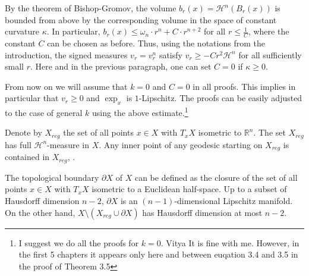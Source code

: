 \documentclass[12pt,leqno]{amsart}
\numberwithin{equation}{section}
\theoremstyle{definition}
\theoremstyle{remark}
\newcommand{\R}{\mathbb{R}}
\begin{document}
By the theorem of Bishop-Gromov, the volume $b_r (x)=\mathcal H^n (B_r(x))$ is bounded from above by the corresponding volume in the
space of constant curvature $\kappa$. In particular, $b_r (x) \leq \omega _n \cdot r^n + C \cdot r^{n+2}$ for all $r\leq \frac 1 C$, where
the constant $C$ can be chosen as before.  Thus, using the notations from the introduction, the signed measures $v_r  =v_r^n $ satisfy
$v_r \geq -Cr^2 \mathcal H^n$  for all sufficiently small $r$.
 Here and in the previous paragraph,  one can set $C=0$ if $\kappa \geq 0$.

 {\color{red} From now on we will assume that $k=0$ and $C=0$ in all proofs. This implies in particular that $v_r\ge 0$ and $\exp_x$ is $1$-Lipschitz. The proofs can be  easily adjusted to the case of general $k$ using the above estimate.}\footnote{{\color{red}I suggest we do all the proofs for $k=0$. Vitya}  It is fine with me. However, in the first 5 chapters it appears only here and  between euqation 3.4 and 3.5 in the proof of Theorem 3.5}


Denote by $X_{reg}$ the set of all points $x\in X$ with $T_xX$   isometric to $\R^n$.  The set $X_{reg}$ has full $\mathcal H^n$-measure in $X$.
Any inner point of any geodesic starting on $X_{reg}$ is contained in $X_{reg}$, \cite{Petparallel}.


The topological boundary $\partial X$ of $X$ can be defined as the closure of the  set of all points $x\in X$ with $T_xX$ isometric to a Euclidean half-space. Up to a subset of Hausdorff dimension $n-2$, $\partial X$ is an $(n-1)$-dimensional Lipschitz manifold. On the other hand, $X\setminus (X_{reg} \cup \partial X)$ has Hausdorff dimension at most $n-2$.
\end{document}
